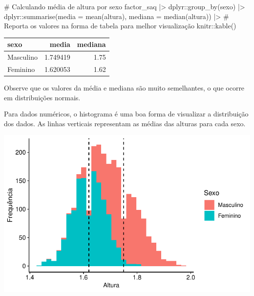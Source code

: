 \documentclass[
  letterpaper,
  DIV=11,
  numbers=noendperiod]{scrartcl}
\newenvironment{Shaded}{\begin{snugshade}}{\end{snugshade}}
\newcommand{\AttributeTok}[1]{\textcolor[rgb]{0.40,0.45,0.13}{#1}}
\newcommand{\CommentTok}[1]{\textcolor[rgb]{0.37,0.37,0.37}{#1}}
\newcommand{\FunctionTok}[1]{\textcolor[rgb]{0.28,0.35,0.67}{#1}}
\newcommand{\NormalTok}[1]{\textcolor[rgb]{0.00,0.23,0.31}{#1}}
\newcommand{\SpecialCharTok}[1]{\textcolor[rgb]{0.37,0.37,0.37}{#1}}
\begin{document}
\begin{Shaded}
\begin{Highlighting}[]
\CommentTok{\# Calculando média de altura por sexo}
\NormalTok{factor\_saq }\SpecialCharTok{|\textgreater{}} 
\NormalTok{  dplyr}\SpecialCharTok{::}\FunctionTok{group\_by}\NormalTok{(sexo) }\SpecialCharTok{|\textgreater{}} 
\NormalTok{  dplyr}\SpecialCharTok{::}\FunctionTok{summarise}\NormalTok{(}\AttributeTok{media =} \FunctionTok{mean}\NormalTok{(altura), }\AttributeTok{mediana =} \FunctionTok{median}\NormalTok{(altura))  }\SpecialCharTok{|\textgreater{}} 
  \CommentTok{\# Reporta os valores na forma de tabela para melhor visualização}
\NormalTok{  knitr}\SpecialCharTok{::}\FunctionTok{kable}\NormalTok{()}
\end{Highlighting}
\end{Shaded}

\begin{longtable}[]{@{}lrr@{}}
\toprule\noalign{}
sexo & media & mediana \\
\midrule\noalign{}
\endhead
\bottomrule\noalign{}
\endlastfoot
Masculino & 1.749419 & 1.75 \\
Feminino & 1.620053 & 1.62 \\
\end{longtable}

Observe que os valores da média e mediana são muito semelhantes, o que
ocorre em distribuições normais.

Para dados numéricos, o histograma é uma boa forma de visualizar a
distribuição dos dados. As linhas verticais representam as médias das
alturas para cada sexo.

\includegraphics{descritiva_files/figure-pdf/unnamed-chunk-19-1.pdf}
\end{document}
